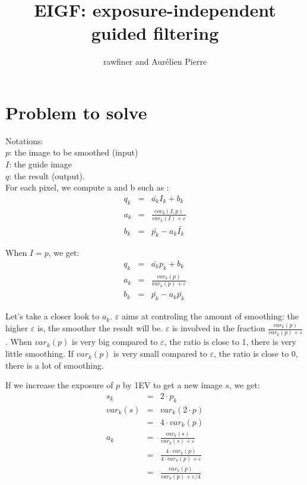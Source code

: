 \documentclass[12pt,a4paper]{article}
\author{rawfiner and Aurélien Pierre}
\title{EIGF: exposure-independent guided filtering}
\begin{document}
\maketitle

\section{Problem to solve}

Notations:\\
$p$: the image to be smoothed (input)\\
$I$: the guide image\\
$q$: the result (output).\\

For each pixel, we compute a and b such as :
\begin{eqnarray}
q_k &=& \bar{a_k}I_k + b_k\\
a_k &=& \frac{cov_k(I,p)}{var_k(I) + \varepsilon}
\\
b_k &=& \bar{p_k} - a_k\bar{I_k}
\end{eqnarray}

When $I = p$, we get:
\begin{eqnarray}
q_k &=& \bar{a_k}p_k + b_k\\
a_k &=& \frac{var_k(p)}{var_k(p) + \varepsilon}
\\
b_k &=& \bar{p_k} - a_k\bar{p_k}
\end{eqnarray}

Let's take a closer look to $a_k$.
$\varepsilon$ aims at controling the amount of smoothing: the higher $\varepsilon$ is, the smoother the result will be.
$\varepsilon$ is involved in the fraction $\frac{var_k(p)}{var_k(p) + \varepsilon}$.
When $var_k(p)$ is very big compared to $\varepsilon$, the ratio is close to 1, there is very little smoothing.
If $var_k(p)$ is very small compared to $\varepsilon$, the ratio is close to 0, there is a lot of smoothing.

If we increase the exposure of $p$ by 1EV to get a new image $s$, we get:
\begin{eqnarray}
s_k &=& 2 \cdot p_k\\
var_k(s) &=& var_k(2 \cdot p) \\
&=& 4 \cdot var_k(p)\\
a_k &=& \frac{var_k(s)}{var_k(s) + \varepsilon}\\
 &=& \frac{4 \cdot var_k(p)}{4 \cdot var_k(p) + \varepsilon}\\
 &=& \frac{var_k(p)}{var_k(p) + \varepsilon / 4}\\
\end{eqnarray}
\end{document}

